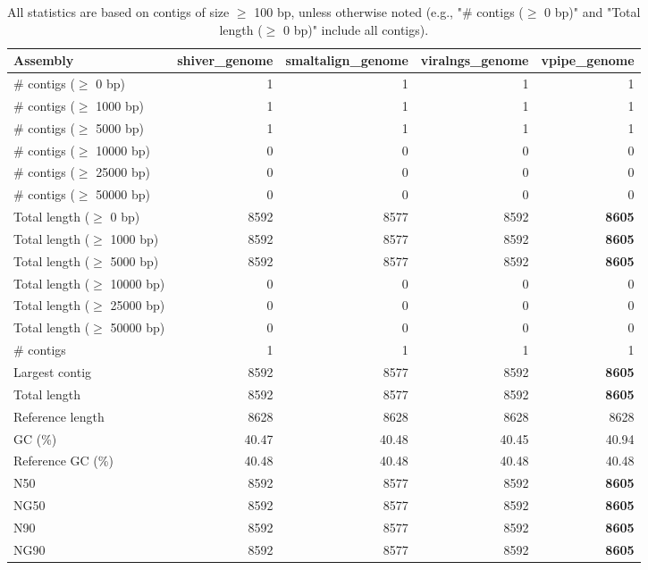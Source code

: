 \documentclass[12pt,a4paper]{article}
\begin{document}
\begin{table}[ht]
\begin{center}
\caption{All statistics are based on contigs of size $\geq$ 100 bp, unless otherwise noted (e.g., "\# contigs ($\geq$ 0 bp)" and "Total length ($\geq$ 0 bp)" include all contigs).}
\begin{tabular}{|l*{4}{|r}|}
\hline
Assembly & shiver\_genome & smaltalign\_genome & viralngs\_genome & vpipe\_genome \\ \hline
\# contigs ($\geq$ 0 bp) & 1 & 1 & 1 & 1 \\ \hline
\# contigs ($\geq$ 1000 bp) & 1 & 1 & 1 & 1 \\ \hline
\# contigs ($\geq$ 5000 bp) & 1 & 1 & 1 & 1 \\ \hline
\# contigs ($\geq$ 10000 bp) & 0 & 0 & 0 & 0 \\ \hline
\# contigs ($\geq$ 25000 bp) & 0 & 0 & 0 & 0 \\ \hline
\# contigs ($\geq$ 50000 bp) & 0 & 0 & 0 & 0 \\ \hline
Total length ($\geq$ 0 bp) & 8592 & 8577 & 8592 & {\bf 8605} \\ \hline
Total length ($\geq$ 1000 bp) & 8592 & 8577 & 8592 & {\bf 8605} \\ \hline
Total length ($\geq$ 5000 bp) & 8592 & 8577 & 8592 & {\bf 8605} \\ \hline
Total length ($\geq$ 10000 bp) & 0 & 0 & 0 & 0 \\ \hline
Total length ($\geq$ 25000 bp) & 0 & 0 & 0 & 0 \\ \hline
Total length ($\geq$ 50000 bp) & 0 & 0 & 0 & 0 \\ \hline
\# contigs & 1 & 1 & 1 & 1 \\ \hline
Largest contig & 8592 & 8577 & 8592 & {\bf 8605} \\ \hline
Total length & 8592 & 8577 & 8592 & {\bf 8605} \\ \hline
Reference length & 8628 & 8628 & 8628 & 8628 \\ \hline
GC (\%) & 40.47 & 40.48 & 40.45 & 40.94 \\ \hline
Reference GC (\%) & 40.48 & 40.48 & 40.48 & 40.48 \\ \hline
N50 & 8592 & 8577 & 8592 & {\bf 8605} \\ \hline
NG50 & 8592 & 8577 & 8592 & {\bf 8605} \\ \hline
N90 & 8592 & 8577 & 8592 & {\bf 8605} \\ \hline
NG90 & 8592 & 8577 & 8592 & {\bf 8605} \\ \hline

\end{tabular}
\end{center}
\end{table}
\end{document}
